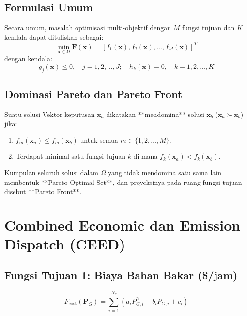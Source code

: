 \documentclass[11pt,a4paper]{article}
\begin{document}
\subsection{Formulasi Umum}
Secara umum, masalah optimisasi multi-objektif dengan $M$ fungsi tujuan dan $K$ kendala dapat dituliskan sebagai:
\begin{equation}
    \min_{\mathbf{x} \in \Omega} \mathbf{F}(\mathbf{x}) = \left[ f_1(\mathbf{x}), f_2(\mathbf{x}), \dots, f_M(\mathbf{x}) \right]^T
\end{equation}
dengan kendala:
\begin{equation}
    g_j(\mathbf{x}) \le 0, \quad j=1,2,\dots,J; \quad h_k(\mathbf{x}) = 0, \quad k=1,2,\dots,K
\end{equation}

\subsection{Dominasi Pareto dan Pareto Front}
\begin{tcolorbox}[colback=white,colframe=unibblue,title=\textbf{Konsep Dominasi Pareto}]
Suatu solusi Vektor keputusan $\mathbf{x}_a$ dikatakan **mendomina** solusi $\mathbf{x}_b$ ($\mathbf{x}_a \succ \mathbf{x}_b$) jika:
\begin{enumerate}
    \item $f_m(\mathbf{x}_a) \le f_m(\mathbf{x}_b)$ untuk semua $m \in \{1, 2, \dots, M\}$.
    \item Terdapat minimal satu fungsi tujuan $k$ di mana $f_k(\mathbf{x}_a) < f_k(\mathbf{x}_b)$.
\end{enumerate}
\end{tcolorbox}

Kumpulan seluruh solusi dalam $\Omega$ yang tidak mendomina satu sama lain membentuk **Pareto Optimal Set**, dan proyeksinya pada ruang fungsi tujuan disebut **Pareto Front**.

\section{Combined Economic dan Emission Dispatch (CEED)}

\subsection{Fungsi Tujuan 1: Biaya Bahan Bakar (\$/jam)}
\begin{equation}
    F_{\text{cost}}(\mathbf{P}_G) = \sum_{i=1}^{N_g} \left( a_i P_{G,i}^2 + b_i P_{G,i} + c_i \right)
\end{equation}
\end{document}
